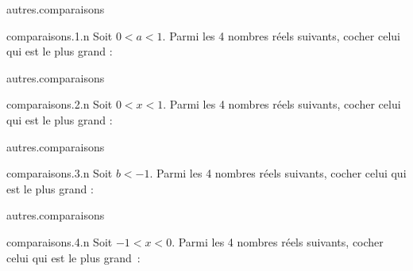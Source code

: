 \begin{qcm}{autres.comparaisons}
    \begin{question}{comparaisons.1.n}
      Soit \(0<a<1\). Parmi les 4 nombres réels suivants, cocher celui qui est le plus grand :  
        \vspace{-0.2cm}
      \begin{multicols}{2}   
	\begin{reponses}       
	\end{reponses}
      \end{multicols}	
    \end{question}
\end{qcm}

\begin{qcm}{autres.comparaisons}
    \begin{question}{comparaisons.2.n}
      Soit \(0<x<1\). Parmi les 4 nombres réels suivants, cocher celui qui est le plus grand :
        \vspace{-0.2cm}
      \begin{multicols}{2}   
	\begin{reponses}   
	\end{reponses} 
      \end{multicols}
    \end{question}
\end{qcm}

\begin{qcm}{autres.comparaisons}
    \begin{question}{comparaisons.3.n}
      Soit \(b<-1\). Parmi les 4 nombres réels suivants, cocher celui qui est le plus grand :
        \vspace{-0.2cm}
	\begin{reponseshoriz}       
	\end{reponseshoriz} 
    \end{question}
\end{qcm}

\begin{qcm}{autres.comparaisons}
    \begin{question}{comparaisons.4.n}
      Soit \(-1<x<0\). Parmi les 4 nombres réels suivants, cocher celui qui est le plus grand~:
        \vspace{-0.2cm}
	\begin{reponseshoriz}       
	\end{reponseshoriz} 
    \end{question}
\end{qcm}

